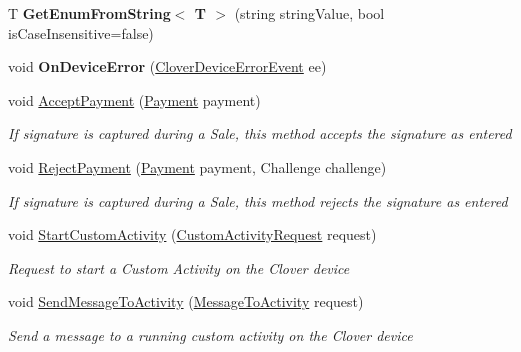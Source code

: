 \begin{DoxyCompactItemize}
T {\bfseries Get\+Enum\+From\+String$<$ T $>$} (string string\+Value, bool is\+Case\+Insensitive=false)
\item 
\mbox{\label{classcom_1_1clover_1_1remotepay_1_1sdk_1_1_clover_connector_a5bf3c2b75b879b1462d573d0fcbd1ce5}} 
void {\bfseries On\+Device\+Error} (\hyperlink{classcom_1_1clover_1_1remotepay_1_1sdk_1_1_clover_device_error_event}{Clover\+Device\+Error\+Event} ee)
\item 
void \hyperlink{classcom_1_1clover_1_1remotepay_1_1sdk_1_1_clover_connector_afe33a1ba414608b2b05a3336128c7b5c}{Accept\+Payment} (\hyperlink{classcom_1_1clover_1_1sdk_1_1v3_1_1payments_1_1_payment}{Payment} payment)
\begin{DoxyCompactList}\small\item\em If signature is captured during a Sale, this method accepts the signature as entered \end{DoxyCompactList}\item 
void \hyperlink{classcom_1_1clover_1_1remotepay_1_1sdk_1_1_clover_connector_a2ffc66f46fddbf37d780ca269dd3b562}{Reject\+Payment} (\hyperlink{classcom_1_1clover_1_1sdk_1_1v3_1_1payments_1_1_payment}{Payment} payment, Challenge challenge)
\begin{DoxyCompactList}\small\item\em If signature is captured during a Sale, this method rejects the signature as entered \end{DoxyCompactList}\item 
void \hyperlink{classcom_1_1clover_1_1remotepay_1_1sdk_1_1_clover_connector_a7c4a08c49e7285e95d7e36340ebe3306}{Start\+Custom\+Activity} (\hyperlink{classcom_1_1clover_1_1remotepay_1_1sdk_1_1_custom_activity_request}{Custom\+Activity\+Request} request)
\begin{DoxyCompactList}\small\item\em Request to start a Custom Activity on the Clover device \end{DoxyCompactList}\item 
void \hyperlink{classcom_1_1clover_1_1remotepay_1_1sdk_1_1_clover_connector_a328a0dd8b4ed02567f7e8d3184f35038}{Send\+Message\+To\+Activity} (\hyperlink{classcom_1_1clover_1_1remotepay_1_1sdk_1_1_message_to_activity}{Message\+To\+Activity} request)
\begin{DoxyCompactList}\small\item\em Send a message to a running custom activity on the Clover device \end{DoxyCompactList}\item 

\end{DoxyCompactItemize}

